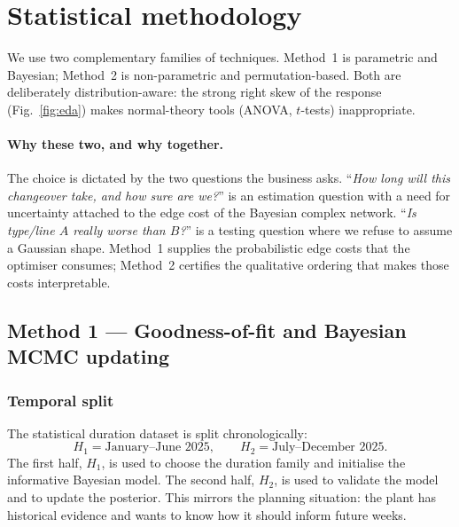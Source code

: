 \documentclass[11pt,a4paper]{article}
\begin{document}
\section{Statistical methodology}\label{sec:methods}
We use two complementary families of techniques. Method~1 is parametric and
Bayesian; Method~2 is non-parametric and permutation-based. Both are deliberately
distribution-aware: the strong right skew of the response (Fig.~\ref{fig:eda})
makes normal-theory tools (ANOVA, $t$-tests) inappropriate.

\paragraph{Why these two, and why together.}
The choice is dictated by the two questions the business asks. ``\emph{How long
will this changeover take, and how sure are we?}'' is an estimation question with
a need for uncertainty attached to the edge cost of the Bayesian complex network.
``\emph{Is type/line $A$ really worse than $B$?}'' is a testing question where we
refuse to assume a Gaussian shape. Method~1 supplies the probabilistic edge costs
that the optimiser consumes; Method~2 certifies the qualitative ordering that
makes those costs interpretable.

\subsection{Method 1 --- Goodness-of-fit and Bayesian MCMC updating}\label{sec:m1}

\subsubsection{Temporal split}
The statistical duration dataset is split chronologically:
\[
H_1=\text{January--June 2025}, \qquad
H_2=\text{July--December 2025}.
\]
The first half, $H_1$, is used to choose the duration family and initialise the
informative Bayesian model. The second half, $H_2$, is used to validate the model
and to update the posterior. This mirrors the planning situation: the plant has
historical evidence and wants to know how it should inform future weeks.
\end{document}
